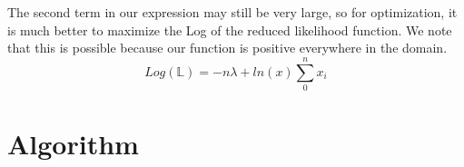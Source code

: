 \documentclass[12pt]{article}
\begin{document}
The second term in our expression may still be very large, so for optimization, it is much better to maximize the Log of the reduced likelihood function. We note that this is possible because our function is positive everywhere in the domain.\\
\begin{equation}\label{key}
Log(\mathbb{L})= -n\lambda+ln(x)\sum_{0}^{n}x_i
\end{equation}















%
%
%
%
\section{Algorithm}
\end{document}
